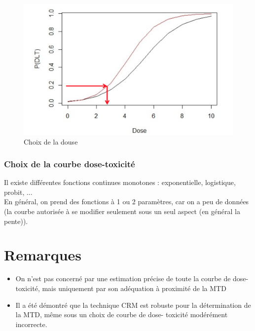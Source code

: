 \begin{figure}[H]
    \centering
    \includegraphics[scale=0.3]{images/CRMdose.png}
    \caption{Choix de la douse}
    \label{fig:CRMdose}
\end{figure}

\subsubsection{Choix de la courbe dose-toxicité}
Il existe différentes fonctions continues monotones : exponentielle, logistique, probit, ...\\
En général, on prend des fonctions à 1 ou 2 paramètres, car on a peu de données (la courbe autorisée à se modifier seulement sous un seul aspect (en général la pente)). 


\section{Remarques}

\begin{itemize}
    \item On n’est pas concerné par une estimation précise de toute la courbe de dose-toxicité, mais uniquement par son adéquation à proximité de la MTD
    \item Il a été démontré que la technique CRM est robuste pour la détermination de la MTD, même sous un choix de courbe de dose- toxicité modérément incorrecte.
\end{itemize}